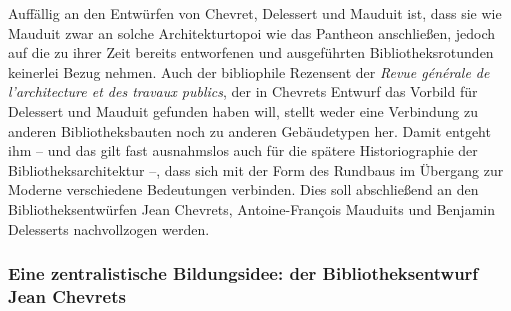 Auffällig an den Entwürfen von Chevret, Delessert und Mauduit ist, dass
sie wie Mauduit zwar an solche Architekturtopoi wie das Pantheon
anschließen, jedoch auf die zu ihrer Zeit bereits entworfenen und
ausgeführten Bibliotheksrotunden keinerlei Bezug nehmen. Auch der
bibliophile Rezensent der \emph{Revue générale de l'architecture et des
travaux publics}, der in Chevrets Entwurf das Vorbild für Delessert und
Mauduit gefunden haben will, stellt weder eine Verbindung zu anderen
Bibliotheksbauten noch zu anderen Gebäudetypen her. Damit entgeht ihm --
und das gilt fast ausnahmslos auch für die spätere Historiographie der
Bibliotheksarchitektur --, dass sich mit der Form des Rundbaus im
Übergang zur Moderne verschiedene Bedeutungen verbinden. Dies soll
abschließend an den Bibliotheksentwürfen Jean Chevrets, Antoine-François
Mauduits und Benjamin Delesserts nachvollzogen werden.

\subsubsection{Eine zentralistische Bildungsidee: der Bibliotheksentwurf
Jean
Chevrets}\label{eine-zentralistische-bildungsidee-der-bibliotheksentwurf-jean-chevrets}

